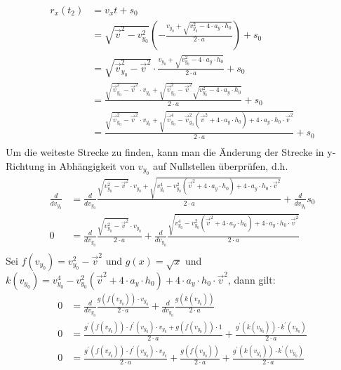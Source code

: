 \documentclass[sectionformat = aufgabe]{gadsescript}
\begin{document}
\begin{enumerate}[label=\alph*)]
		\begin{align*}
			r_x(t_2) &= v_xt + s_0\\
			~&= \sqrt{\vec v^2 - v_{y_0}^2} \left( - \frac{v_{y_0} + \sqrt{v_{y_0}^2 - 4\cdot a_y\cdot h_0}}{2\cdot a}\right) + s_0\\
			~&= \sqrt{\vec v_{y_0}^2 - \vec v^2 } \cdot \frac{v_{y_0} + \sqrt{v_{y_0}^2 - 4\cdot a_y\cdot h_0}}{2\cdot a} + s_0\\
			~&= \frac{\sqrt{\vec v_{y_0}^2 - \vec v^2 } \cdot v_{y_0} + \sqrt{\vec v_{y_0}^2 - \vec v^2 }\sqrt{v_{y_0}^2 - 4\cdot a_y\cdot h_0}}{2\cdot a} + s_0\\
			~&= \frac{\sqrt{\vec v_{y_0}^2 - \vec v^2 } \cdot v_{y_0} + \sqrt{\vec v_{y_0}^4 - \vec v_{y_0}^2 \left( \vec v^2 + 4 \cdot a_y \cdot h_0 \right) + 4\cdot a_y\cdot h_0 \cdot \vec v^2}}{2\cdot a} + s_0\\
		\end{align*}
		Um die weiteste Strecke zu finden, kann man die Änderung der Strecke in y-Richtung in Abhängigkeit von $ v_{y_0} $ auf Nullstellen überprüfen, d.h.
		\begin{align*}
			\frac{d}{dv_{y_0}} &= \frac{d}{dv_{y_0}}  \frac{\sqrt{v_{y_0}^2 - \vec v^2 } \cdot v_{y_0} + \sqrt{v_{y_0}^4 - v_{y_0}^2 \left( \vec v^2 + 4 \cdot a_y \cdot h_0 \right) + 4\cdot a_y\cdot h_0 \cdot \vec v^2}}{2\cdot a} + \frac{d}{dv_{y_0}}s_0\\
			0 &= \frac{d}{dv_{y_0}}  \frac{\sqrt{v_{y_0}^2 - \vec v^2 } \cdot v_{y_0}}{2\cdot a} + \frac{d}{dv_{y_0}}\frac{\sqrt{v_{y_0}^4 - v_{y_0}^2 \left( \vec v^2 + 4 \cdot a_y \cdot h_0 \right) + 4\cdot a_y\cdot h_0 \cdot \vec v^2}}{2\cdot a} \\
		\end{align*}
		Sei $ f(v_{y_0}) = v_{y_0}^2 - \vec v^2 $ und $ g(x) = \sqrt{x} $ und $ k(v_{y_0}) = {v_{y_0}^4 - v_{y_0}^2 \left( \vec v^2 + 4 \cdot a_y \cdot h_0 \right) + 4\cdot a_y\cdot h_0 \cdot \vec v^2} $, dann gilt:
		\begin{align*}
			0 &= \frac{d}{dv_{y_0}}  \frac{g(f(v_{y_0})) \cdot v_{y_0}}{2\cdot a} + \frac{d}{dv_{y_0}}\frac{g(k(v_{y_0})) }{2\cdot a} \\
			0 &=  \frac{g^\prime(f(v_{y_0}))\cdot f^\prime(v_{y_0}) \cdot v_{y_0} + g(f(v_{y_0})) \cdot 1}{2\cdot a} + \frac{g^\prime(k(v_{y_0}))\cdot k^\prime(v_{y_0}) }{2\cdot a} \\
			0 &=  \frac{g^\prime(f(v_{y_0}))\cdot f^\prime(v_{y_0}) \cdot v_{y_0}}{2\cdot a} + \frac{g(f(v_{y_0})) }{2\cdot a} + \frac{g^\prime(k(v_{y_0}))\cdot k^\prime(v_{y_0}) }{2\cdot a} \\

\end{align*}
\end{enumerate}
\end{document}
